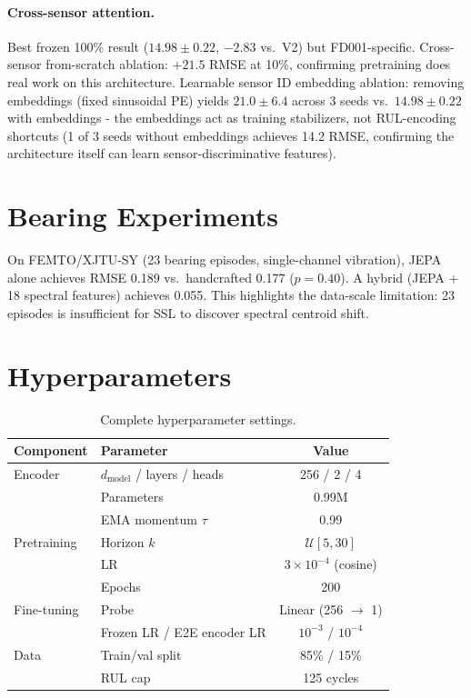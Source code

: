 \documentclass{article}
\begin{document}
\paragraph{Cross-sensor attention.} Best frozen 100\% result ($14.98 \pm 0.22$, $-2.83$ vs.\ V2) but FD001-specific. Cross-sensor from-scratch ablation: $+21.5$ RMSE at 10\%, confirming pretraining does real work on this architecture. Learnable sensor ID embedding ablation: removing embeddings (fixed sinusoidal PE) yields $21.0 \pm 6.4$ across 3 seeds vs.\ $14.98 \pm 0.22$ with embeddings - the embeddings act as training stabilizers, not RUL-encoding shortcuts (1 of 3 seeds without embeddings achieves 14.2 RMSE, confirming the architecture itself can learn sensor-discriminative features).

\section{Bearing Experiments}
\label{app:bearings}

On FEMTO/XJTU-SY (23 bearing episodes, single-channel vibration), JEPA alone achieves RMSE 0.189 vs.\ handcrafted 0.177 ($p = 0.40$). A hybrid (JEPA + 18 spectral features) achieves 0.055. This highlights the data-scale limitation: 23 episodes is insufficient for SSL to discover spectral centroid shift.

\section{Hyperparameters}
\label{app:hyperparams}

\begin{table}[h]
\centering
\caption{Complete hyperparameter settings.}
\label{tab:hyperparams}
\small
\begin{tabular}{@{}llc@{}}
\toprule
Component & Parameter & Value \\
\midrule
Encoder & $d_\text{model}$ / layers / heads & 256 / 2 / 4 \\
& Parameters & 0.99M \\
& EMA momentum $\tau$ & 0.99 \\
Pretraining & Horizon $k$ & $\mathcal{U}[5, 30]$ \\
& LR & $3 \times 10^{-4}$ (cosine) \\
& Epochs & 200 \\
Fine-tuning & Probe & Linear (256 $\to$ 1) \\
& Frozen LR / E2E encoder LR & $10^{-3}$ / $10^{-4}$ \\
Data & Train/val split & 85\% / 15\% \\
& RUL cap & 125 cycles \\
\bottomrule
\end{tabular}
\end{table}
\end{document}
